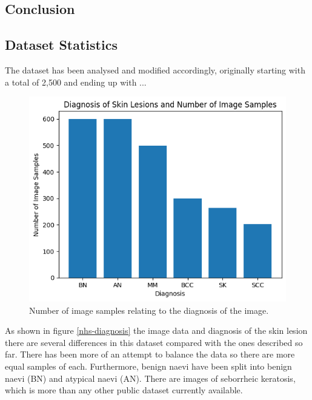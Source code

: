 \subsection{Conclusion}



\subsection{Dataset Statistics}
The dataset has been analysed and modified accordingly, originally starting with a total of 2,500 and ending up with ...

\begin{figure}
    \centering
    \includegraphics[scale=0.75]{images/nhs/nhs-diagnosis.png}
    \caption{Number of image samples relating to the diagnosis of the image.} 
\end{figure}\label{nhs-diagnosis}

 As shown in figure \ref{nhs-diagnosis} the image data and diagnosis of the skin lesion there are several differences in this dataset compared with the ones described so far. There has been more of an attempt to balance the data so there are more equal samples of each. Furthermore, benign naevi have been split into benign naevi (BN) and atypical naevi (AN). There are images of seborrheic keratosis, which is more than any other public dataset currently available. 

